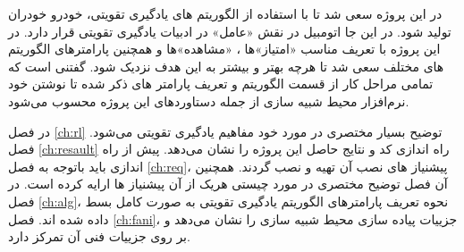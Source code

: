 در این پروژه سعی شد تا با استفاده از الگوریتم های یادگیری تقویتی، خودرو خودران تولید شود. در این جا اتومبیل در نقش «عامل» در ادبیات یادگیری تقویتی قرار دارد. در این پروژه با تعریف مناسب «امتیاز»ها ، «مشاهده»ها و همچنین پارامترهای الگوریتم های مختلف سعی شد تا هرچه بهتر و بیشتر به این هدف نزدیک شود. گفتنی است که تمامی مراحل کار از قسمت الگوریتم و تعریف پارامتر های ذکر شده تا نوشتن خود نرم‌افزار محیط شبیه سازی از جمله دستاوردهای این پروژه محسوب می‌شود.

در فصل \ref{ch:rl} توضیح بسیار مختصری در مورد خود مفاهیم یادگیری تقویتی می‌شود. فصل \ref{ch:resault} راه اندازی کد و نتایج حاصل این پروژه را نشان می‌دهد. پیش از راه اندازی باید باتوجه به فصل \ref{ch:req}، پیشنیاز های نصب آن تهیه و نصب گردند. همچنین آن فصل توضیح مختصری در مورد چیستی هریک از آن پیشنیاز ها ارایه کرده است. در فصل \ref{ch:alg}، نحوه تعریف پارامترهای الگوریتم یادگیری تقویتی به صورت کامل بسط داده شده اند. فصل \ref{ch:fani}، جزییات پیاده سازی محیط شبیه سازی را نشان می‌دهد و بر روی جزییات فنی آن تمرکز دارد.



